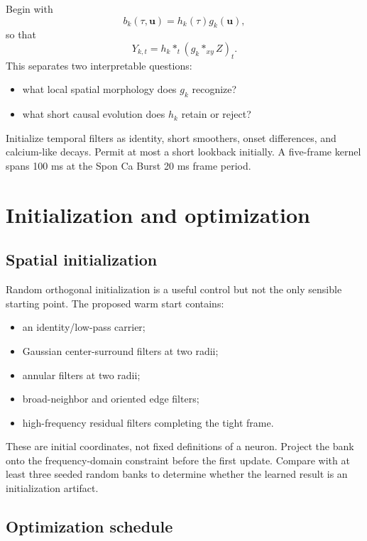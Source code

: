 \documentclass[11pt]{article}
\newcommand{\conv}{\mathbin{*}}
\begin{document}
Begin with
\begin{equation}
b_k(\tau,\bm u)=h_k(\tau)g_k(\bm u),
\label{eq:factorized-kernel}
\end{equation}
so that
\begin{equation}
Y_{k,t}
=
h_k\conv_t
\left(g_k\conv_{xy}Z\right)_t.
\end{equation}
This separates two interpretable questions:
\begin{itemize}[leftmargin=*]
\item what local spatial morphology does $g_k$ recognize?
\item what short causal evolution does $h_k$ retain or reject?
\end{itemize}
Initialize temporal filters as identity, short smoothers, onset differences,
and calcium-like decays. Permit at most a short lookback initially. A five-frame
kernel spans 100 ms at the Spon Ca Burst 20 ms frame period.

\section{Initialization and optimization}

\subsection{Spatial initialization}

Random orthogonal initialization is a useful control but not the only sensible
starting point. The proposed warm start contains:
\begin{itemize}[leftmargin=*]
\item an identity/low-pass carrier;
\item Gaussian center-surround filters at two radii;
\item annular filters at two radii;
\item broad-neighbor and oriented edge filters;
\item high-frequency residual filters completing the tight frame.
\end{itemize}
These are initial coordinates, not fixed definitions of a neuron. Project the
bank onto the frequency-domain constraint before the first update. Compare with
at least three seeded random banks to determine whether the learned result is
an initialization artifact.

\subsection{Optimization schedule}
\end{document}
